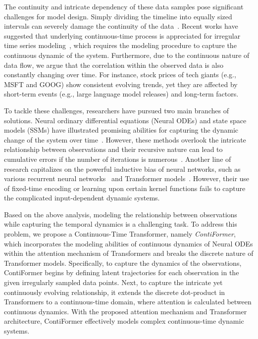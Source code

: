 \documentclass{article}
\begin{document}
The continuity and intricate dependency of these data samples pose significant challenges for model design. 
Simply dividing the timeline into equally sized intervals can severely damage the continuity of the data~\cite{lipton2016directly}. 
Recent works have suggested that underlying continuous-time process is appreciated for irregular time series modeling~\cite{rubanova2019latent, kidger2020neural, che2018recurrent, mei2017neural}, which requires the modeling procedure to capture the continuous dynamic of the system. 
Furthermore, due to the continuous nature of data flow, we argue that the correlation within the observed data is also constantly changing over time.
For instance, stock prices of tech giants (e.g., MSFT and GOOG) show consistent evolving trends, yet they are affected by short-term events (e.g., large language model releases) and long-term factors. 

To tackle these challenges, researchers have pursued two main branches of solutions. 
Neural ordinary differential equations (Neural ODEs) and state space models (SSMs) have illustrated promising abilities for capturing the dynamic change of the system over time~\cite{smith2022simplified, kidger2022neural, chen2018neural, gu2021efficiently}. 
However, these methods overlook the intricate relationship between observations and their recursive nature can lead to cumulative errors if the number of iterations is numerous~\cite{chen2018neural}.
Another line of research capitalizes on the powerful inductive bias of neural networks, such as various recurrent neural networks~\cite{che2018recurrent, mei2017neural, schirmer2022modeling} and Transformer models~\cite{xu2019self, shukla2021multi, ma2022non, zhang2019attain}. 
However, their use of fixed-time encoding or learning upon certain kernel functions fails to capture the complicated input-dependent dynamic systems.

Based on the above analysis, modeling the relationship between observations while capturing the temporal dynamics is a challenging task. 
To address this problem, we propose a Continuous-Time Transformer, namely \textit{ContiFormer}, which incorporates the modeling abilities of continuous dynamics of Neural ODEs within the attention mechanism of Transformers and breaks the discrete nature of Transformer models.
Specifically, to capture the dynamics of the observations, ContiFormer begins by defining latent trajectories for each observation in the given irregularly sampled data points. 
Next, to capture the intricate yet continuously evolving relationship, it extends the discrete dot-product in Transformers to a continuous-time domain, where attention is calculated between continuous dynamics. 
With the proposed attention mechanism and Transformer architecture, ContiFormer effectively models complex continuous-time dynamic systems. 
\end{document}
